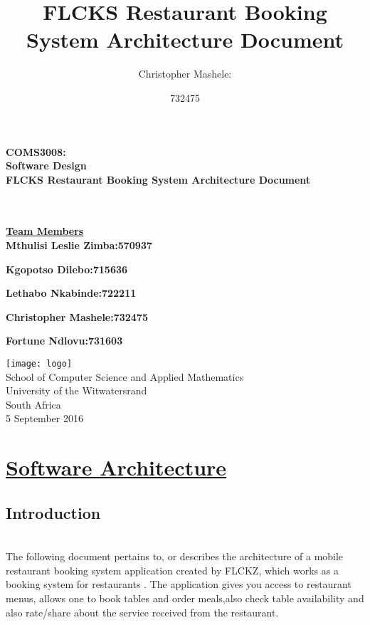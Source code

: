 \documentclass{article}
\title{FLCKS Restaurant Booking System Architecture Document }
\author{
	Christopher Mashele:\\
	\and
	732475\\
	}
\begin{document}
\begin{titlepage}
	
		\hspace{0.5cm}
		\huge
		\center
		\textbf{COMS3008:\\ Software Design}\\

		\vspace*{1cm}
		\Large
		\hspace{2cm}
		\center
		\textbf{FLCKS Restaurant Booking System Architecture Document}\\\\\\
		\vspace*{2cm}
		\normalsize
		\hspace{2.5cm}

		\textbf{\underline{Team Members}}\\

		\textbf{Mthulisi Leslie Zimba:\hfill570937}

		\textbf{Kgopotso Dilebo:\hfill 715636}

		\textbf{Lethabo Nkabinde:\hfill 722211}

		\textbf{Christopher Mashele:\hfill 732475}
		
		\textbf{Fortune Ndlovu:\hfill 731603}

		
		\vspace{2cm}
		\normalsize
		\hspace{4cm}
		\centre
		\texttt{[image: logo]}\\
		\hspace{3cm} School of Computer Science and Applied Mathematics\\
		\hspace{3cm}University of the Witwatersrand\\
		\hspace{3cm} South Africa\\
		\hspace{3cm} 5 September 2016 \\
	
\end{titlepage}

\tableofcontents
\pagebreak
\section{\underline{Software Architecture}}
\subsection{Introduction}\\
The following document  pertains to, or describes the architecture of a mobile restaurant booking system application created by FLCKZ,  which works as a booking system for restaurants . The application gives you access to restaurant menus, allows one to book tables and order meals,also check table availability and also rate/share about the service received from the restaurant.\\
\end{document}
